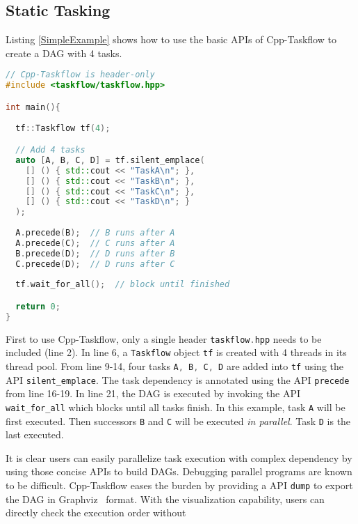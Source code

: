 \documentclass[sigconf]{acmart}
\def\codeinline{\lstinline[basicstyle=\small\color{darkgray},language=C++]}
\begin{document}
\subsection{Static Tasking}
Listing \ref{SimpleExample} shows how to use the basic APIs of Cpp-Taskflow to create a DAG with 4 tasks.

\begin{lstlisting}[language=C++,label=SimpleExample,caption={A simple example.}]
// Cpp-Taskflow is header-only
#include <taskflow/taskflow.hpp>  

int main(){
  
  tf::Taskflow tf(4);

  // Add 4 tasks
  auto [A, B, C, D] = tf.silent_emplace(
    [] () { std::cout << "TaskA\n"; },               
    [] () { std::cout << "TaskB\n"; },               
    [] () { std::cout << "TaskC\n"; },               
    [] () { std::cout << "TaskD\n"; }                
  );                                                 
                                                     
  A.precede(B);  // B runs after A                   
  A.precede(C);  // C runs after A                   
  B.precede(D);  // D runs after B                   
  C.precede(D);  // D runs after C                   
                                                     
  tf.wait_for_all();  // block until finished

  return 0;
}
\end{lstlisting} 

First to use Cpp-Taskflow, only a single header \codeinline{taskflow.hpp} needs
to be included (line 2).  In line 6, a \codeinline{Taskflow} object
\codeinline{tf} is created with 4 threads in its thread pool. From line 9-14,
four tasks \codeinline{A, B, C, D} are added into \codeinline{tf} using the API
\codeinline{silent_emplace}.  The task dependency is annotated using the API
\codeinline{precede} from line 16-19. In line 21, the DAG is executed by
invoking the API \codeinline{wait_for_all} which blocks until all tasks finish.
In this example, task \codeinline{A} will be first executed. Then  successors
\codeinline{B} and \codeinline{C} will be executed \emph{in parallel}. Task
\codeinline{D} is the last executed.

It is clear users can easily parallelize task execution with complex dependency 
by using those concise APIs to build DAGs. Debugging parallel programs are known 
to be difficult. Cpp-Taskflow eases the burden by providing a API
\codeinline{dump} to export the DAG in Graphviz~\cite{graphviz} format. 
With the visualization capability, users can directly check the execution order 
without 
\end{document}
